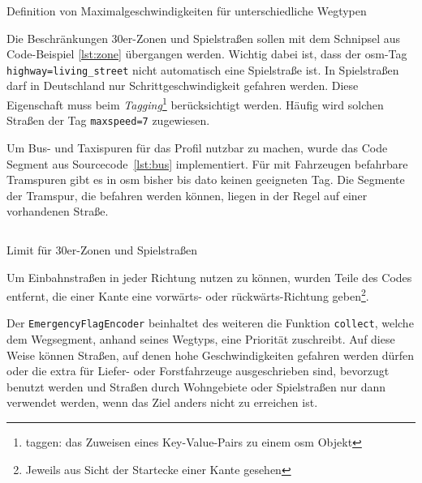 \begin{listing}[htb]
\centering
{}
\inputminted[gobble=2, fontsize=\footnotesize, breaklines, breakbytoken=|, firstline=169, lastline=199]{java}{../data/JavaFiles/EmergencyFlagEncoder.java}
\caption{Definition von Maximalgeschwindigkeiten für unterschiedliche Wegtypen}
\label{lst:flag}
\end{listing}

Die Beschränkungen 30er-Zonen und Spielstraßen sollen mit dem Schnipsel aus Code-Beispiel \ref{lst:zone} übergangen werden. \newline
Wichtig dabei ist, dass der \gls{osm}-Tag \texttt{highway=living\_street} nicht automatisch eine Spielstraße ist.
In Spielstraßen darf in Deutschland nur Schrittgeschwindigkeit gefahren werden.
Diese Eigenschaft muss beim \textit{Tagging}\footnote{taggen: das Zuweisen eines Key-Value-Pairs zu einem \gls{osm} Objekt} berücksichtigt werden.
Häufig wird solchen Straßen der Tag \texttt{maxspeed=7} zugewiesen.


Um Bus- und Taxispuren für das Profil nutzbar zu machen, wurde das Code Segment aus Sourcecode~\ref{lst:bus} implementiert.
Für mit Fahrzeugen befahrbare Tramspuren gibt es in \gls{osm} bisher bis dato keinen geeigneten Tag.
Die Segmente der Tramspur, die befahren werden können, liegen in der Regel auf einer vorhandenen Straße.
\begin{listing}[htb]
\centering
{}
\inputminted[gobble=2, fontsize=\footnotesize, breaklines=true, breakbytoken=|, firstline=299, lastline=303]{java}{../data/JavaFiles/EmergencyFlagEncoder.java}
\caption{Limit für 30er-Zonen und Spielstraßen}
\label{lst:zone}
\end{listing}

Um Einbahnstraßen in jeder Richtung nutzen zu können, wurden Teile des Codes entfernt, die einer Kante eine vorwärts- oder rückwärts-Richtung geben\footnote{Jeweils aus Sicht der Startecke einer Kante gesehen}.

Der \texttt{EmergencyFlagEncoder} beinhaltet des weiteren die Funktion \texttt{collect}, welche dem Wegsegment, anhand seines Wegtyps, eine Priorität zuschreibt.
Auf diese Weise können Straßen, auf denen hohe Geschwindigkeiten gefahren werden dürfen oder die extra für Liefer- oder Forstfahrzeuge ausgeschrieben sind, bevorzugt benutzt werden und Straßen durch Wohngebiete oder Spielstraßen nur dann verwendet werden, wenn das Ziel anders nicht zu erreichen ist.

